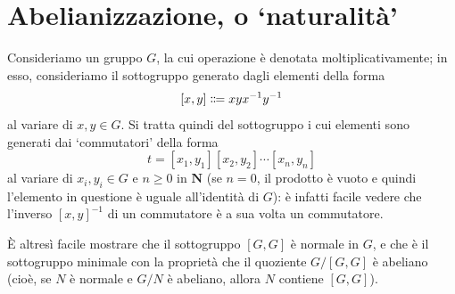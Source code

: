 \section*{Abelianizzazione, o `naturalità'}
Consideriamo un gruppo \(G\), la cui operazione è denotata moltiplicativamente; in esso, consideriamo il sottogruppo generato dagli elementi della forma
\[[x,y]\defeq  xyx^{-1}y^{-1}\]
al variare di \(x,y\in G\). Si tratta quindi del sottogruppo i cui elementi sono generati dai `commutatori' della forma
\[t = [x_1,y_1][x_2,y_2]\cdots[x_n,y_n]\]
al variare di \(x_i,y_i\in G\) e \(n\ge 0\) in \(\mathbf{N}\) (se \(n=0\), il prodotto è vuoto e quindi l'elemento in questione è uguale all'identità di \(G\)): è infatti facile vedere che l'inverso \([x,y]^{-1}\) di un commutatore è a sua volta un commutatore.

È altresì facile mostrare che il sottogruppo \([G,G]\) è normale in \(G\), e che è il sottogruppo minimale con la proprietà che il quoziente \(G/[G,G]\) è abeliano (cioè, se \(N\) è normale e \(G/N\) è abeliano, allora \(N\) contiene \([G,G]\)).

